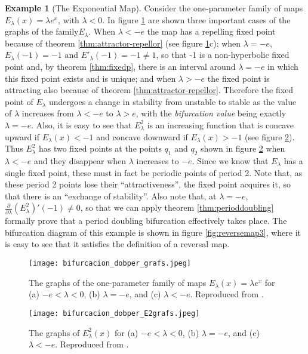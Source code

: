 \documentclass[10pt,twoside,titlepage]{book}
\numberwithin{equation}{chapter}
\numberwithin{figure}{chapter}
\numberwithin{table}{chapter}
\theoremstyle{plain}%
\theoremstyle{definition}
\newtheorem{example}{Example}[chapter]
\theoremstyle{remark}
\begin{document}
\begin{example}[The Exponential Map]
	Consider the one-parameter family of maps $E_{\lambda}(x)=\lambda e^x$, with $\lambda<0$. In figure \ref{fig:reversemap1} are shown three important cases of the graphs of the family$E_{\lambda}$. When $\lambda<-e$ the map has a repelling fixed point because of theorem \ref{thm:attractor-repellor} (see figure \ref{fig:reversemap1}c); when $\lambda=-e$, $E_{\lambda}(-1)=-1$ and $E'_{\lambda}(-1)=-1\neq 1$, so that -1 is a non-hyperbolic fixed point and, by theorem \ref{thm:fixedp}, there is an interval around $\lambda=-e$ in which this fixed point exists and is unique; and when $\lambda>-e$ the fixed point is attracting also because of theorem \ref{thm:attractor-repellor}. Therefore the fixed point of $E_{\lambda}$ undergoes a change in stability from unstable to stable as the value of $\lambda$ increases from $\lambda<-e$ to $\lambda>e$, with the \emph{bifurcation value} being exactly $\lambda=-e$. Also, it is easy to see that $E^2_{\lambda}$ is an increasing function that is concave upward if $E_{\lambda}(x)
	<-1$ and concave downward if $E_{\lambda}(x)>-1$ (see figure \ref{fig:reversemap2}). Thus $E^2_{\lambda}$ has two fixed points at the points $q_1$ and $q_2$ shown in figure \ref{fig:reversemap2} when $\lambda<-e$ and they disappear when $\lambda$ increases to $-e$. Since we know that $E_{\lambda}$ has a single fixed point, these must in fact be periodic points of period 2. Note that, as these period 2 points lose their ``attractiveness'', the fixed point acquires it, so that there is an ``exchange of stability''. Also note that, at $\lambda=-e$,  $\frac{\partial}{\partial\lambda}\left(E^2_{\lambda}\right)'(-1)\neq0$, so that we can apply theorem \ref{thm:perioddoubling} formally prove that a period doubling bifurcation effectively takes place. The bifurcation diagram of this example is shown in figure \ref{fig:reversemap3}, where it is easy to see that it satisfies the definition of a reversal map.
	
	\begin{figure}
		\centering
		\texttt{[image: bifurcacion\_dobper\_grafs.jpeg]}
		\caption{The graphs of the one-parameter family of maps $E_{\lambda}(x)=\lambda e^x$ for (a) $-e<\lambda<0$, (b) $\lambda=-e$, and (c) $\lambda<-e$. Reproduced from \cite{DevaneyIntroCDD}.}
		\label{fig:reversemap1}
	\end{figure}
	
	\begin{figure}
		\centering
		\texttt{[image: bifurcacion\_dobper\_E2grafs.jpeg]}
		\caption{The graphs of $E^2_{\lambda}(x)$ for (a) $-e<\lambda<0$, (b) $\lambda=-e$, and (c) $\lambda<-e$. Reproduced from \cite{DevaneyIntroCDD}.}
		\label{fig:reversemap2}
	\end{figure}
	

\end{example}
\end{document}
